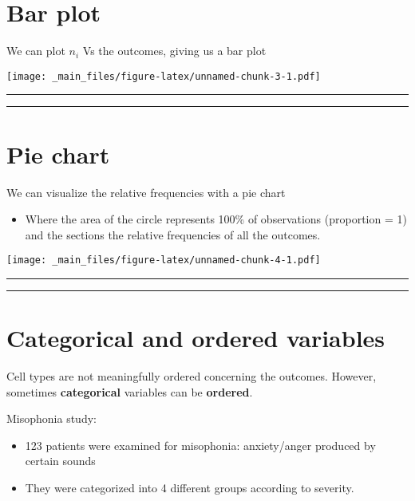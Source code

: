 \documentclass[
]{book}
\providecommand{\tightlist}{%
  \setlength{\itemsep}{0pt}\setlength{\parskip}{0pt}}
\begin{document}
\hypertarget{bar-plot}{%
\section{Bar plot}\label{bar-plot}}

We can plot \(n_i\) Vs the outcomes, giving us a bar plot

\texttt{[image: \_main\_files/figure-latex/unnamed-chunk-3-1.pdf]}

\begin{center}\rule{0.5\linewidth}{0.5pt}\end{center}

\begin{center}\rule{0.5\linewidth}{0.5pt}\end{center}

\hypertarget{pie-chart}{%
\section{Pie chart}\label{pie-chart}}

We can visualize the relative frequencies with a pie chart

\begin{itemize}
\tightlist
\item
  Where the area of the circle represents 100\% of observations (proportion = 1) and the sections the relative frequencies of all the outcomes.
\end{itemize}

\texttt{[image: \_main\_files/figure-latex/unnamed-chunk-4-1.pdf]}

\begin{center}\rule{0.5\linewidth}{0.5pt}\end{center}

\begin{center}\rule{0.5\linewidth}{0.5pt}\end{center}

\hypertarget{categorical-and-ordered-variables}{%
\section{Categorical and ordered variables}\label{categorical-and-ordered-variables}}

Cell types are not meaningfully ordered concerning the outcomes. However, sometimes \textbf{categorical} variables can be \textbf{ordered}.

Misophonia study:

\begin{itemize}
\item
  123 patients were examined for misophonia: anxiety/anger produced by certain sounds
\item
  They were categorized into 4 different groups according to severity.
\end{itemize}
\end{document}
